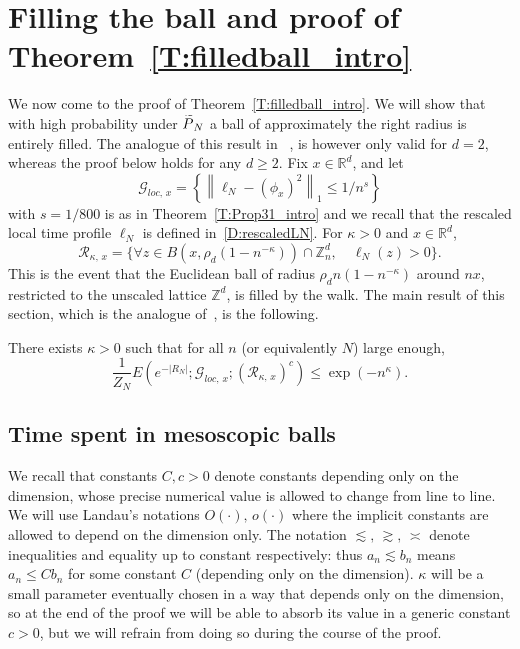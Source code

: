 \documentclass[AHL, Unicode, longabstracts, published]{cedram}
\newcommand*\Z {{\mathbb Z}}
\newcommand*\R{\mathbb{R}}
\newcommand*\E {{E}}
\newcommand*\wP{\smash{\widetilde P}}
\newcommand{\cG}{\mathcal{G}}
\newcommand{\cR}{\mathcal{R}}
\let\oldforall\forall
\renewcommand*{\forall}{\mathrel{\oldforall}}
\begin{document}
\section{Filling the ball and proof of Theorem~\ref{T:filledball_intro} }
\label{S:filling}

We now come to the proof of Theorem~\ref{T:filledball_intro}. We will show that with high probability under $\wP_N$ a ball of approximately the right radius is entirely filled. The analogue of this result in~\cite[Proposition~4.1]{BO} , is however only valid for $d=2$, whereas the proof below holds for any $d \ge 2$. Fix $x \in \R^d$, and let
\[
\cG_{loc,\,x} = \left\{ \left\|\ell_N - (\phi_x)^2 \right\|_1 \le 1/ n^{s}\right \}
\]
with $s = 1/800$ is as in Theorem~\ref{T:Prop31_intro} and we recall that the rescaled local time profile $\ell_N$ is defined in~\eqref{D:rescaledLN}. For $\kappa>0$ and $x \in \R^d$,
\[
\cR_{\kappa,\,x} = \big\{\forall z \in B\left(x, \rho_d (1 - n^{- \kappa})\right) \cap \Z_n^d,\quad \ell_N(z)>0 \big \}.
\]
This is the event that the Euclidean ball of radius $\rho_d n (1 - n^{-\kappa})$ around $nx$, restricted to the unscaled lattice $\mathbb{Z}^d$, is filled by the walk. The main result of this section, which is the analogue of~\cite[Proposition~4.1]{BO}, is the following.

\begin{theo}\label{T:filledball}
There exists $\kappa>0$ such that for all $n$ (or equivalently $N$) large enough,
\[
\frac1{Z_N}\E\left(e^{ - |R_N|} ; \cG_{loc,\,x} ; (\cR_{\kappa,\,x})^c\right) \le \exp(- n^{\kappa}).
\]
\end{theo}


\subsection{Time spent in mesoscopic balls}\label{S:time_meso}

We recall that constants $C, c>0$ denote constants depending only on the dimension, whose precise numerical value is allowed to change from line to line. We will use Landau's notations $O(\cdot),\,o(\cdot)$ where the implicit constants are allowed to depend on the dimension only. The notation $\lesssim,\,\gtrsim,\,\asymp$ denote inequalities and equality up to constant respectively: thus $a_n \lesssim b_n$ means $a_n \le C b_n$ for some constant $C$ (depending only on the dimension). $\kappa$ will be a small parameter eventually chosen in a way that depends only on the dimension, so at the end of the proof we will be able to absorb its value in a generic constant $c>0$, but we will refrain from doing so during the course of the proof.
\end{document}

